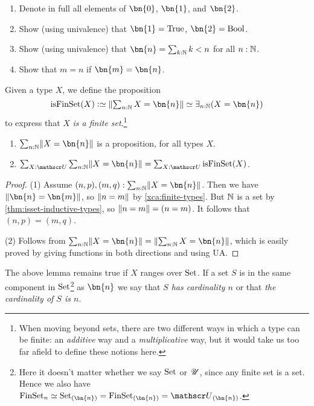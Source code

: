 \begin{xca}\label{xca:finite-types}
\hspace{1in}
  \begin{enumerate}
  \item Denote in full all elements of $\bn{0}$, $\bn{1} $, and $\bn{2}$.
  \item Show (using univalence) that $\bn{1} =\true$, $\bn{2} =\bool$.
  \item Show (using univalence) that $\bn{n} = \sum_{k:\NN} k<n$ for all $n:\mathbb{N}$.
  \item Show that $m=n$ if $\bn{m}=\bn{n}$.\qedhere
  \end{enumerate}
\end{xca}
\begin{definition}\label{def:is-finite}
  Given a type $X$, we define the proposition
  \[
    \textstyle
    \isfinset(X) \defeq \Trunc*{\sum_{n:\NN}X=\bn{n}}
    \jdeq \exists_{n:\NN}(X=\bn{n})
  \]
  to express that $X$ \emph{is a finite set}.\footnote{%
    When moving beyond sets, there are two different ways
    in which a type can be finite: an \emph{additive}
    way and a \emph{multiplicative} way, but
    it would take us too far afield to define these notions
    here.} %
\end{definition}
\begin{lemma}\label{lem:maxonefinitetype}
\leavevmode
\begin{enumerate}
  \item $\sum_{n:\NN}\Trunc{X=\bn{n}}$ is a proposition, for all types $X$.
  \item 
$\sum_{X:\UU}\sum_{n:\NN}\Trunc{X=\bn{n}} =\sum_{X:\UU}\isfinset(X)$.
  \end{enumerate}
\end{lemma}
\begin{proof}

(1) Assume $(n,p),(m,q): \sum_{n:\NN}\Trunc{X=\bn{n}}$.
Then we have $\Trunc{\bn{n}=\bn{m}}$, so $\lVert n=m\rVert$
by \cref{xca:finite-types}. But $\mathbb{N}$ is a set by \cref{thm:isset-inductive-types}, 
so $\lVert n=m\rVert=(n=m)$. It follows that $(n,p)=(m,q)$.

(2) Follows from $\sum_{n:\NN}\Trunc{X=\bn{n}} =\Trunc{\sum_{n:\NN}X=\bn{n}}$,
which is easily proved by giving functions in both directions and using UA.
\end{proof}

The above lemma remains true if $X$ ranges over $\mathrm{Set}$.
If a set $S$ is in the same component in $\mathrm{Set}$\footnote{%
  Here it doesn't matter whether we say $\mathrm{Set}$ or ${\mathscr{U}}$,
  since any finite set is a set.
  Hence we also have $\FinSet_n
  \jdeq \Set_{(\bn{n})} = \FinSet_{(\bn{n})}
  = \UU_{(\bn{n})}$.}
as $\bn{n}$ we say that \emph{$S$ has cardinality $n$} or that \emph{the cardinality of $S$ is $n$}.

